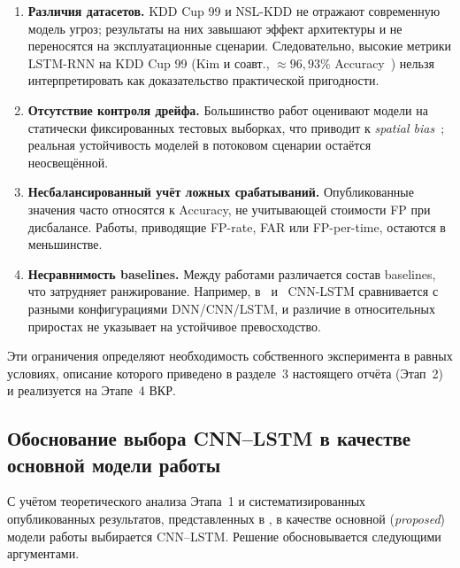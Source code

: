 \begin{enumerate}
    \item \textbf{Различия датасетов.} KDD Cup 99 и NSL-KDD не отражают
    современную модель угроз; результаты на них завышают эффект
    архитектуры и не переносятся на эксплуатационные сценарии. Следовательно,
    высокие метрики LSTM-RNN на KDD Cup 99 (Kim и соавт.,
    \(\approx 96{,}93\%\) Accuracy~\cite{kim2016lstm}) нельзя
    интерпретировать как доказательство практической пригодности.
    \item \textbf{Отсутствие контроля дрейфа.} Большинство работ оценивают
    модели на статически фиксированных тестовых выборках, что приводит к
    \emph{spatial bias}~\cite{pendlebury2019tesseract}; реальная
    устойчивость моделей в потоковом сценарии остаётся неосвещённой.
    \item \textbf{Несбалансированный учёт ложных срабатываний.} Опубликованные
    значения часто относятся к Accuracy, не учитывающей стоимости FP при
    дисбалансе. Работы, приводящие FP-rate, FAR или FP-per-time, остаются
    в меньшинстве.
    \item \textbf{Несравнимость baselines.} Между работами различается состав
    baselines, что затрудняет ранжирование. Например,
    в~\cite{vinayakumar2019dl} и~\cite{ahmad2021nids} CNN-LSTM сравнивается
    с разными конфигурациями DNN/CNN/LSTM, и различие в относительных
    приростах не указывает на устойчивое превосходство.
\end{enumerate}

Эти ограничения определяют необходимость собственного эксперимента в равных
условиях, описание которого приведено в разделе~3 настоящего отчёта (Этап~2)
и реализуется на Этапе~4 ВКР.

\subsection{Обоснование выбора CNN--LSTM в качестве основной модели работы}
\label{subsec:why-cnnlstm}

С учётом теоретического анализа Этапа~1 и систематизированных опубликованных
результатов, представленных в , в качестве
основной (\emph{proposed}) модели работы выбирается CNN--LSTM. Решение
обосновывается следующими аргументами.

